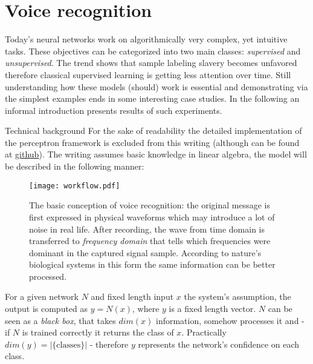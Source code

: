 \section{Voice recognition}

Today's neural networks work on algorithmically very complex, yet intuitive tasks. These objectives can be categorized into two main classes: \emph{supervised} and \emph{unsupervised}. The trend shows that sample labeling slavery becomes unfavored therefore classical supervised learning is getting less attention over time. Still understanding how these models (should) work is essential and demonstrating via the simplest examples ends in some interesting case studies. In the following an informal introduction presents results of such experiments.

    {Technical background}
For the sake of readability the detailed implementation of the perceptron framework is excluded from this writing (although can be found at \href{https://github.com/botcs/deepvision/tree/master/demo/audio}{github}). 
The writing assumes basic knowledge in linear algebra, the model will be described in the following manner: \\
 
\begin{figure}
	\centering
	\texttt{[image: workflow.pdf]}
	\caption{
	The basic conception of voice recognition: 
	the original message is first expressed in physical waveforms which may introduce a lot of noise in real life. 
	After recording, the wave from time domain is transferred to \emph{frequency domain} that tells which frequencies were dominant in the captured signal sample.
	According to nature's biological systems in this form the same information can be better processed.
	}
	\label{fig:workflow}
\end{figure}

For a given network $N$ and fixed length input $x$ the system's assumption, the output is computed as $y=N(x)$, where $y$ is a fixed length vector.
$N$ can be seen as a \emph{black box}, that takes $dim(x)$ information, somehow processes it and - if $N$ is trained correctly it returns the class of $x$. Practically $dim(y)=|\{\textrm{classes}\}|$ - therefore $y$ represents the network's confidence on each class.

